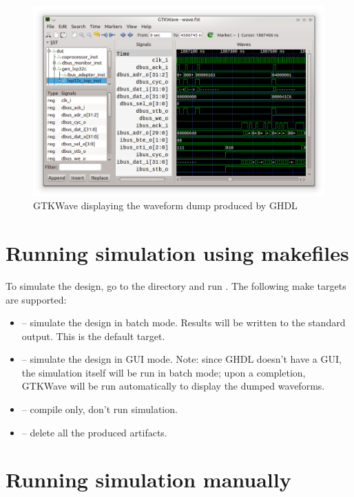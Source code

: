 \documentclass[a4paper,12pt,twoside,extrafontsizes]{memoir}
\begin{document}
\begin{figure}[htbp]
	\centering
	\includegraphics[scale=0.65]{images/gtkwave.png}
	\caption{GTKWave displaying the \lxp{} waveform dump produced by GHDL}
	\label{fig:gtkwave}
\end{figure}

\section{Running simulation using makefiles}

To simulate the design, go to the  directory and run . The following make targets are supported:

\begin{itemize}
	\item {} -- simulate the design in batch mode. Results will be written to the standard output. This is the default target.
	\item {} -- simulate the design in GUI mode. Note: since GHDL doesn't have a GUI, the simulation itself will be run in batch mode; upon a completion, GTKWave will be run automatically to display the dumped waveforms.
	\item {} -- compile only, don't run simulation.
	\item {} -- delete all the produced artifacts.
\end{itemize}

\section{Running simulation manually}
\label{sec:simmanual}
\end{document}
